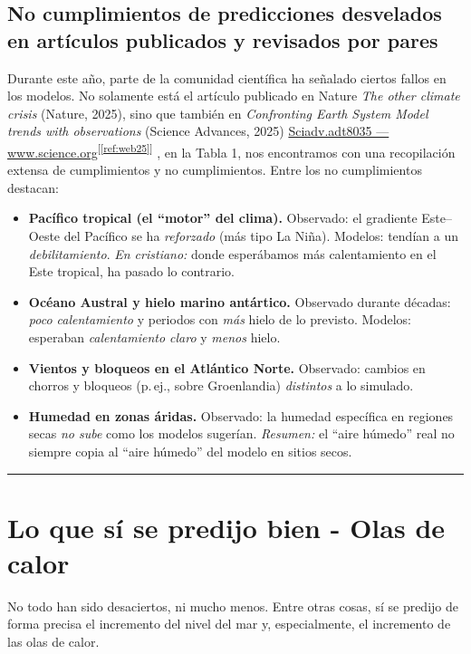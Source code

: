 \documentclass[
  10pt,
  a4paper,
  DIV=11,
  numbers=noendperiod,
  open=any]{scrreprt}
\numberwithin{equation}{chapter}
\numberwithin{equation}{section}
\renewcommand{\[}{\begin{equation}}
\renewcommand{\]}{\end{equation}}
\newcommand{\refweb}[3]{%
  \href{#1}{#2}\textsuperscript{[\ref{ref:#3}]}%
}
\begin{document}
\subsection{No cumplimientos de predicciones desvelados en artículos publicados y revisados por pares}

Durante este año, parte de la comunidad científica ha señalado ciertos fallos en los modelos. No solamente está el artículo publicado en Nature \textit{The other climate crisis} (Nature, 2025), sino que también en \textit{Confronting Earth System Model trends with observations} (Science Advances, 2025) \refweb{https://www.science.org/doi/10.1126/sciadv.adt8035}{Sciadv.adt8035 — www.science.org}{web25}, en la Tabla 1, nos encontramos con una recopilación extensa de cumplimientos y no cumplimientos. Entre los no cumplimientos destacan:

\begin{itemize}
  \item \textbf{Pacífico tropical (el “motor” del clima).} 
  Observado: el gradiente Este–Oeste del Pacífico se ha \emph{reforzado} (más tipo La Niña). 
  Modelos: tendían a un \emph{debilitamiento}. 
  \emph{En cristiano:} donde esperábamos más calentamiento en el Este tropical, ha pasado lo contrario.
  \item \textbf{Océano Austral y hielo marino antártico.}
  Observado durante décadas: \emph{poco calentamiento} y periodos con \emph{más} hielo de lo previsto. 
  Modelos: esperaban \emph{calentamiento claro} y \emph{menos} hielo.
  \item \textbf{Vientos y bloqueos en el Atlántico Norte.}
  Observado: cambios en chorros y bloqueos (p.\,ej., sobre Groenlandia) \emph{distintos} a lo simulado. 
  \item \textbf{Humedad en zonas áridas.}
  Observado: la humedad específica en regiones secas \emph{no sube} como los modelos sugerían. 
  \emph{Resumen:} el “aire húmedo” real no siempre copia al “aire húmedo” del modelo en sitios secos.
\end{itemize}

\begin{center}\rule{0.5\linewidth}{0.5pt}\end{center}

\section{Lo que sí se predijo bien - Olas de calor}

No todo han sido desaciertos, ni mucho menos. Entre otras cosas, sí se predijo de forma precisa el incremento del nivel del mar y, especialmente, el incremento de las olas de calor. 
\end{document}
